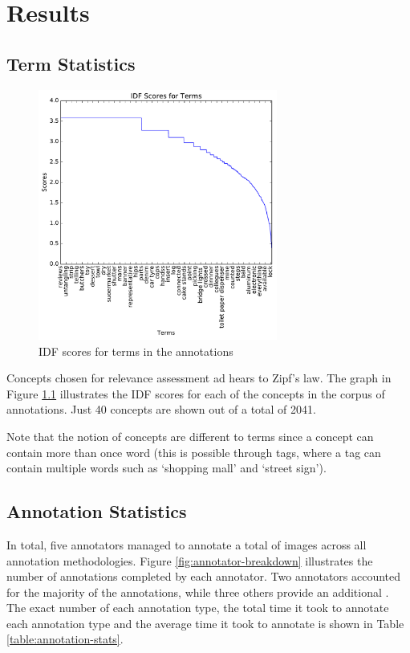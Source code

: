\chapter{Results}

\section{Term Statistics}

\begin{figure}[h]
    \centering
    \includegraphics[width=0.7\textwidth]{graphs/idf-scores}
    \caption{IDF scores for terms in the annotations}
    \label{fig:idf-scores}
\end{figure}

Concepts chosen for relevance assessment ad hears to Zipf's law. The graph in Figure \ref{fig:idf-scores} illustrates the IDF scores for each of the concepts in the corpus of annotations. Just 40 concepts are shown out of a total of 2041. 

Note that the notion of concepts are different to terms since a concept can contain more than once word (this is possible through tags, where a tag can contain multiple words such as `shopping mall' and `street sign').

\FloatBarrier
\section{Annotation Statistics}

In total, five annotators managed to annotate a total of  images across all annotation methodologies. Figure \ref{fig:annotator-breakdown} illustrates the number of annotations completed by each annotator. Two annotators accounted for the majority of the annotations, while three others provide an additional . The exact number of each annotation type, the total time it took to annotate each annotation type and the average time it took to annotate is shown in Table \ref{table:annotation-stats}.

